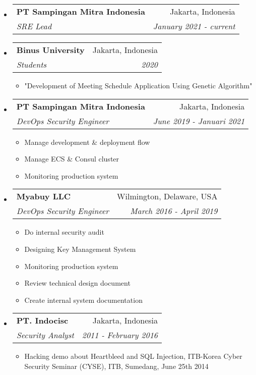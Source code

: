 \documentclass[letterpaper,11pt]{article}
\makeatletter
\newcommand{\resitem}[1]{\item #1 \vspace{-2pt}}
\newcommand{\ressubheading}[4]{
\begin{tabular*}{6.5in}{l@{\cftdotfill{\cftsecdotsep}\extracolsep{\fill}}r}
		\textbf{#1} & #2 \\
		\textit{#3} & \textit{#4} \\
\end{tabular*}\vspace{-6pt}}
\makeatother
\begin{document}
\begin{itemize}

\item

    \ressubheading{PT Sampingan Mitra Indonesia}{Jakarta, Indonesia}{SRE Lead}{January 2021 - current}

\item

	\ressubheading{Binus University}{Jakarta, Indonesia}{Students}{2020}

	\begin{itemize}

		\resitem{"Development of Meeting Schedule Application Using Genetic Algorithm"}

	\end{itemize}
\item

    \ressubheading{PT Sampingan Mitra Indonesia}{Jakarta, Indonesia}{DevOps Security Engineer}{June 2019 - Januari 2021}
	\begin{itemize}

  		\resitem{Manage development \& deployment flow}

		\resitem{Manage ECS \& Consul cluster}

		\resitem{Monitoring production system}

	\end{itemize}

\item

    \ressubheading{Myabuy LLC}{Wilmington, Delaware, USA}{DevOps Security Engineer}{March 2016 - April 2019}
	\begin{itemize}

  		\resitem{Do internal security audit}

		\resitem{Designing Key Management System}

		\resitem{Monitoring production system}

		\resitem{Review technical design document}

		\resitem{Create internal system documentation}

	\end{itemize}

\item

	\ressubheading{PT. Indocisc}{Jakarta, Indonesia}{Security Analyst}{2011 - February 2016}

	\begin{itemize}

    	\resitem{Hacking demo about Heartbleed and SQL Injection, ITB-Korea Cyber Security Seminar (CYSE), ITB, Sumedang, June 25th 2014}


\end{itemize}
\end{itemize}
\end{document}
